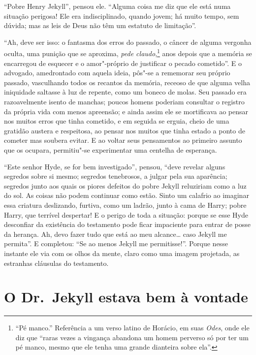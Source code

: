 “Pobre Henry Jekyll”, pensou ele.  “Alguma coisa me diz que ele está
numa situação perigosa!  Ele era indisciplinado, quando jovem; há muito
tempo, sem dúvida; mas as leis de Deus não têm um estatuto de
limitação”.  

“Ah, deve ser isso: o fantasma dos erros do passado, o câncer de alguma
vergonha oculta, uma punição que se aproxima, \textit{pede claudo},\footnote{
“Pé manco.” Referência a um verso latino de Horácio, em suas \textit{Odes}, onde
ele diz que “raras vezes a vingança abandona um homem perverso só por
ter um pé manco, mesmo que ele tenha uma grande dianteira sobre ela”.}
anos depois que a memória se encarregou de esquecer e o
amor"-próprio de justificar o pecado cometido”.  E o advogado,
amedrontado com aquela ideia, pôs"-se a rememorar seu próprio passado,
vasculhando todos os recantos da memória, receoso de que alguma velha
iniquidade saltasse à luz de repente, como um boneco de molas.  Seu
passado era razoavelmente isento de manchas; poucos homens poderiam
consultar o registro da própria vida com menos apreensão; e ainda assim
ele se mortificava ao pensar nos muitos erros que tinha cometido, e em
seguida se erguia, cheio de uma gratidão austera e respeitosa, ao
pensar nos muitos que tinha estado a ponto de cometer mas soubera
evitar.  E ao voltar seus pensamentos ao primeiro assunto que os
ocupara, permitiu"-se experimentar uma centelha de esperança.

“Este senhor Hyde, se for bem investigado”, pensou, “deve revelar alguns
segredos sobre si mesmo; segredos tenebrosos, a julgar pela sua
aparência; segredos junto aos quais os piores defeitos do pobre Jekyll
reluziriam como a luz do sol.  As coisas não podem continuar como
estão. Sinto um calafrio ao imaginar essa criatura deslizando, furtiva,
como um ladrão, junto à cama de Harry; pobre Harry, que terrível
despertar! E o perigo de toda a situação: porque se esse Hyde
desconfiar da existência do testamento pode ficar impaciente para
entrar de posse da herança.  Ah, devo fazer tudo que está ao meu
alcance\ldots{} caso Jekyll me permita”.  E completou: “Se ao menos Jekyll
me permitisse!”.  Porque nesse instante ele via com os olhos da mente,
claro como uma imagem projetada, as estranhas cláusulas do testamento.


\chapter[O Dr.~Jekyll estava bem à vontade]{O Dr.~Jekyll estava bem à vontade}

